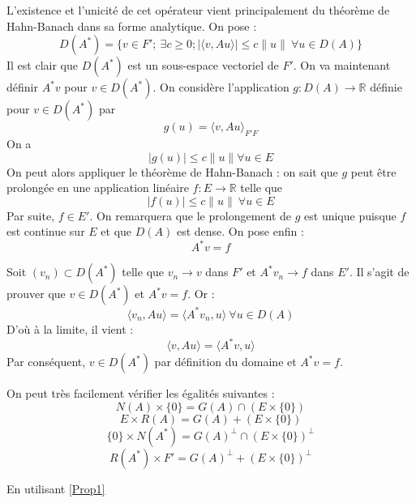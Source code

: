 
L'existence et l'unicité de cet opérateur vient principalement du théorème de Hahn-Banach dans sa forme analytique. On pose : \[D(A^*)=\{v\in F';\ \exists c\geq 0 ; |\langle v,Au\rangle|\leq c\|u\|\ \forall u\in D(A)\}\]
Il est clair que $D(A^*)$ est un sous-espace vectoriel de $F'$. On va maintenant définir $A^*v$ pour $v\in D(A^*)$. On considère l'application $g:D(A)\to\mathbb{R}$ définie pour $v\in D(A^*)$ par \[g(u)=\langle v,Au\rangle_{F'F}\]
On a \[|g(u)|\leq c\|u\| \forall u\in E\]
On peut alors appliquer le théorème de Hahn-Banach : on sait que $g$ peut être prolongée en une application linéaire $f:E\to \mathbb{R}$ telle que \[|f(u)|\leq c\|u\|\ \forall u\in E\]
Par suite, $f\in E'$. On remarquera que le prolongement de $g$ est unique puisque $f$ est continue sur $E$ et que $D(A)$ est dense. On pose enfin : \[A^*v=f\]


\begin{dem}
Soit $(v_n)\subset D(A^*)$ telle que $v_n\to v$ dans $F'$ et $A^*v_n\to f$ dans $E'$. Il s'agit de prouver que $v\in D(A^*)$ et $A^*v=f$. Or : 
	\[\langle v_n, Au\rangle=\langle A^*v_n,u\rangle\ \forall u\in D(A)\]
D'où à la limite, il vient :
	\[\langle v, Au\rangle = \langle A^*v, u\rangle\]
Par conséquent, $v\in D(A^*)$ par définition du domaine et $A^*v=f$.
\end{dem}


\begin{dem}
On peut très facilement vérifier les égalités suivantes :
\begin{equation}\label{eq1} N(A)\times\{0\}=G(A)\cap (E\times\{0\})\end{equation}
\begin{equation}\label{eq2} E\times R(A)=G(A)+(E\times\{0\})\end{equation}
\begin{equation}\label{eq3} \{0\}\times N(A^*)=G(A)^\perp\cap(E\times\{0\})^\perp\end{equation}
\begin{equation}\label{eq4} R(A^*)\times F'=G(A)^\perp+(E\times\{0\})^\perp\end{equation}

En utilisant \ref{Prop1}
\end{dem}
